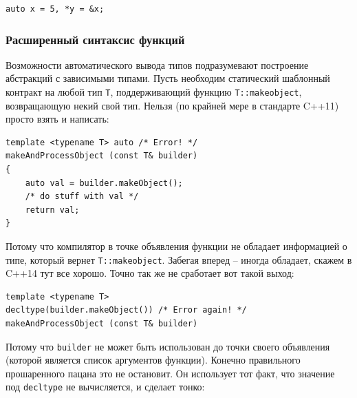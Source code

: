 \documentclass[a4paper,12pt,oneside]{article}
\newif\ifanswers
\begin{document}
\begin{lstlisting}
auto x = 5, *y = &x;
\end{lstlisting}

\ifanswers
Вопрос несколько более простодушен. Правильный ответ: увы, это ошибка. Это, правда, создает некоторые проблемы. Неясно почему вот так можно:

\begin{lstlisting}
auto x = 1; 
auto y = 1.0;
\end{lstlisting}

А вот так нельзя:

\begin{lstlisting}
auto x = 1, y = 1.0; /* ! */
\end{lstlisting}

Написано-то как бы одно и то же. Ждем исправления этого в C++17 или более поздних. С другой стороны, жить это не мешает.
\fi

\subsubsection{Расширенный синтаксис функций}\label{DeclFunctions}

Возможности автоматического вывода типов подразумевают построение абстракций с зависимыми типами. Пусть необходим статический шаблонный контракт на любой тип \lstinline!T!, поддерживающий функцию \lstinline!T::makeobject!, возвращающую некий свой тип. Нельзя (по крайней мере в стандарте C++11) просто взять и написать:

\begin{lstlisting}
template <typename T> auto /* Error! */
makeAndProcessObject (const T& builder)
{
    auto val = builder.makeObject();
    /* do stuff with val */
    return val;
}
\end{lstlisting}

Потому что компилятор в точке объявления функции не обладает информацией о типе, который вернет \lstinline!T::makeobject!. Забегая вперед -- иногда обладает, скажем в C++14 тут все хорошо. Точно так же не сработает вот такой выход:

\begin{lstlisting}
template <typename T> 
decltype(builder.makeObject()) /* Error again! */
makeAndProcessObject (const T& builder)
\end{lstlisting}

Потому что \lstinline!builder! не может быть использован до точки своего объявления (которой является список аргументов функции). Конечно правильного прошаренного пацана это не остановит. Он использует тот факт, что значение под \lstinline!decltype! не вычисляется, и сделает тонко:
\end{document}
